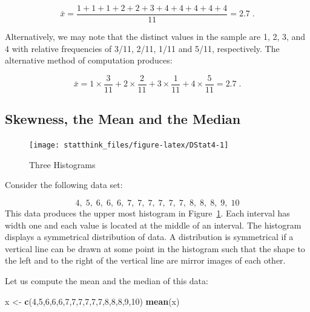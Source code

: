 \documentclass[]{krantz}
\makeatletter
\newenvironment{Shaded}{\begin{snugshade}}{\end{snugshade}}
\newcommand{\KeywordTok}[1]{\textcolor[rgb]{0.13,0.29,0.53}{\textbf{#1}}}
\newcommand{\DecValTok}[1]{\textcolor[rgb]{0.00,0.00,0.81}{#1}}
\newcommand{\StringTok}[1]{\textcolor[rgb]{0.31,0.60,0.02}{#1}}
\newcommand{\NormalTok}[1]{#1}
\newenvironment{kframe}{%
\medskip{}
\setlength{\fboxsep}{.8em}
 \def\at@end@of@kframe{}%
 \ifinner\ifhmode%
  \def\at@end@of@kframe{\end{minipage}}%
  \begin{minipage}{\columnwidth}%
 \fi\fi%
 \def\FrameCommand##1{\hskip\@totalleftmargin \hskip-\fboxsep
 \colorbox{shadecolor}{##1}\hskip-\fboxsep
     \hskip-\linewidth \hskip-\@totalleftmargin \hskip\columnwidth}%
 \MakeFramed {\advance\hsize-\width
   \@totalleftmargin\z@ \linewidth\hsize
   \@setminipage}}%
 {\par\unskip\endMakeFramed%
 \at@end@of@kframe}
\renewenvironment{Shaded}{\begin{kframe}}{\end{kframe}}
\theoremstyle{definition}
\theoremstyle{definition}
\theoremstyle{definition}
\theoremstyle{remark}
\makeatother
\begin{document}
\[\bar x = \frac{1 + 1 + 1 + 2 + 2 + 3 + 4 + 4 + 4 + 4 + 4}{11} = 2.7\;.\]

Alternatively, we may note that the distinct values in the sample are 1,
2, 3, and 4 with relative frequencies of 3/11, 2/11, 1/11 and 5/11,
respectively. The alternative method of computation produces:

\[\bar x = 1\times \frac{3}{11} + 2 \times \frac{2}{11} + 3 \times \frac{1}{11} + 4 \times \frac{5}{11} = 2.7\;.\]

\subsection{Skewness, the Mean and the
Median}\label{skewness-the-mean-and-the-median}

\begin{figure}

{\centering \texttt{[image: statthink\_files/figure-latex/DStat4-1]} 

}

\caption{Three Histograms}\label{fig:DStat4}
\end{figure}

Consider the following data set:

\[4,\; 5,\; 6,\; 6,\; 6,\; 7,\; 7,\; 7,\; 7,\;  7,\;  7,\;  8,\;  8,\;  8,\;  9,\;  10\]
This data produces the upper most histogram in Figure~\ref{fig:DStat4}.
Each interval has width one and each value is located at the middle of
an interval. The histogram displays a symmetrical distribution of data.
A distribution is symmetrical if a vertical line can be drawn at some
point in the histogram such that the shape to the left and to the right
of the vertical line are mirror images of each other.

Let us compute the mean and the median of this data:

\begin{Shaded}
\begin{Highlighting}[]
\NormalTok{x <-}\StringTok{ }\KeywordTok{c}\NormalTok{(}\DecValTok{4}\NormalTok{,}\DecValTok{5}\NormalTok{,}\DecValTok{6}\NormalTok{,}\DecValTok{6}\NormalTok{,}\DecValTok{6}\NormalTok{,}\DecValTok{7}\NormalTok{,}\DecValTok{7}\NormalTok{,}\DecValTok{7}\NormalTok{,}\DecValTok{7}\NormalTok{,}\DecValTok{7}\NormalTok{,}\DecValTok{7}\NormalTok{,}\DecValTok{8}\NormalTok{,}\DecValTok{8}\NormalTok{,}\DecValTok{8}\NormalTok{,}\DecValTok{9}\NormalTok{,}\DecValTok{10}\NormalTok{)}
\KeywordTok{mean}\NormalTok{(x)}
\end{Highlighting}
\end{Shaded}
\end{document}
